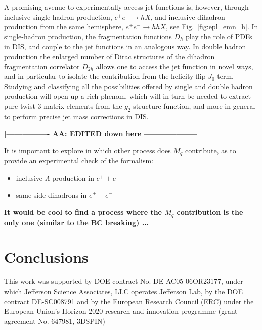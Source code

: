 \documentclass[preprintnumbers,floatfix,nofootinbib]{revtex4}
\newcommand{\todo}[1]{\marginpar{$\bullet$}\textbf{#1}}
\newcommand{\mj}{M_q}
\begin{document}
A promising avenue to experimentally access jet functions is, however, through inclusive single hadron production, $e^+ e^- \to h X$, and inclusive dihadron 
production from the same hemisphere, $e^+ e^- \to h h X$, see 
Fig.~\ref{fig:epl_emn_h}.
In single-hadron production, the fragmentation functions $D_h$
play the role of PDFs in DIS, and couple to the jet functions
in an analogous way.
In double hadron production the enlarged number of Dirac structures
of the dihadron fragmentation correlator $D_{2h}$ allows one to access
the jet function in novel ways, and in particular to isolate the
contribution from the helicity-flip $J_0$ term.
Studying and classifying all the possibilities offered by single and
double hadron production will open up a rich phenom, which will in turn
be needed to extract pure twist-3 matrix elements from the $g_2$ structure function, and more in general to perform precise jet mass corrections in DIS.

{\bf [---------------- AA:  EDITED down here --------------------]}


It is important to explore in which other process does $\mj$ contribute, as to provide an experimental check of the formalism:
\begin{itemize}
\item inclusive $\Lambda$ production in $e^+ + e^-$
\item same-side dihadrons in $e^+ + e^-$ 
\end{itemize}
\todo{It would be cool to find a process where the $\mj$ contribution is the only one (similar to the BC breaking) ...}   



\section{Conclusions}



\begin{acknowledgments}
This work was supported by DOE contract No. DE-AC05-06OR23177,
under which Jefferson Science Associates, LLC operates Jefferson Lab, by the DOE contract DE-SC008791 and 
by the European Research Council (ERC) under the European Union's 
Horizon 2020 research and innovation programme (grant agreement No. 647981,
3DSPIN)
\end{acknowledgments}




\end{document}
